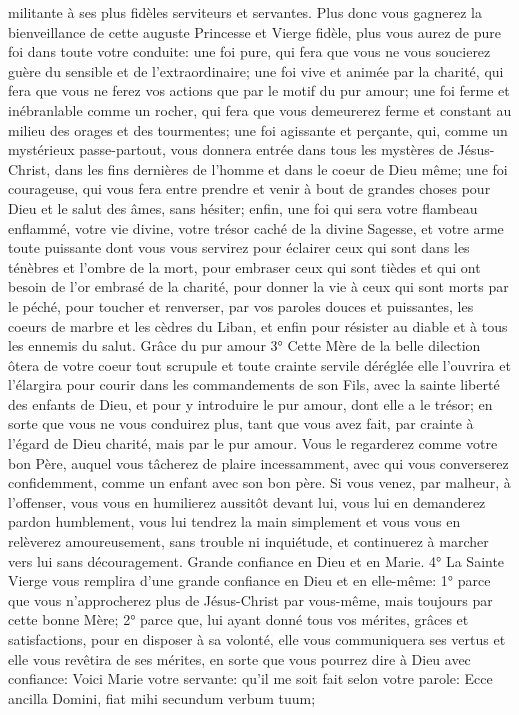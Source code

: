 militante à ses plus fidèles serviteurs et servantes. Plus donc vous gagnerez la bienveillance de cette auguste
Princesse et Vierge fidèle, plus vous aurez de pure foi dans toute votre conduite: une foi pure, qui fera que vous ne
vous soucierez guère du sensible et de l'extraordinaire; une foi vive et animée par la charité, qui fera que vous ne
ferez vos actions que par le motif du pur amour; une foi ferme et inébranlable comme un rocher, qui fera que vous
demeurerez ferme et constant au milieu des orages et des tourmentes; une foi agissante et perçante, qui, comme
un mystérieux passe-partout, vous donnera entrée dans tous les mystères de Jésus-Christ, dans les fins dernières
de l'homme et dans le coeur de Dieu même; une foi courageuse, qui vous fera entre prendre et venir à bout de
grandes choses pour Dieu et le salut des âmes, sans hésiter; enfin, une foi qui sera votre flambeau enflammé,
votre vie divine, votre trésor caché de la divine Sagesse, et votre arme toute puissante dont vous vous servirez
pour éclairer ceux qui sont dans les ténèbres et l'ombre de la mort, pour embraser ceux qui sont tièdes et qui ont
besoin de l'or embrasé de la charité, pour donner la vie à ceux qui sont morts par le péché, pour toucher et
renverser, par vos paroles douces et puissantes, les coeurs de marbre et les cèdres du Liban, et enfin pour
résister au diable et à tous les ennemis du salut.
Grâce du pur amour
 3° Cette Mère de la belle dilection ôtera de votre coeur tout scrupule et toute crainte servile déréglée elle
l'ouvrira et l'élargira pour courir dans les commandements de son Fils, avec la sainte liberté des enfants de Dieu,
et pour y introduire le pur amour, dont elle a le trésor; en sorte que vous ne vous conduirez plus, tant que vous
avez fait, par crainte à l'égard de Dieu charité, mais par le pur amour. Vous le regarderez comme votre bon Père,
auquel vous tâcherez de plaire incessamment, avec qui vous converserez confidemment, comme un enfant avec
son bon père. Si vous venez, par malheur, à l'offenser, vous vous en humilierez aussitôt devant lui, vous lui en
demanderez pardon humblement, vous lui tendrez la main simplement et vous vous en relèverez amoureusement,
sans trouble ni inquiétude, et continuerez à marcher vers lui sans découragement.
Grande confiance en Dieu et en Marie.
 4° La Sainte Vierge vous remplira d'une grande confiance en Dieu et en elle-même:
1° parce que vous n'approcherez plus de Jésus-Christ par vous-même, mais toujours par cette bonne Mère;
2° parce que, lui ayant donné tous vos mérites, grâces et satisfactions, pour en disposer à sa volonté, elle vous communiquera ses vertus et elle vous revêtira de ses mérites, en sorte que vous pourrez dire à Dieu avec confiance: Voici Marie votre servante: qu'il me soit fait selon votre parole: Ecce ancilla Domini, fiat mihi secundum verbum tuum;
